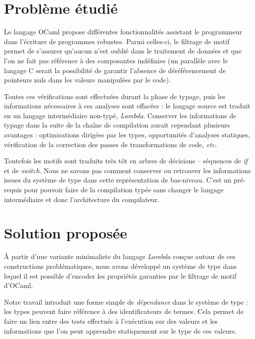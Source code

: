 \documentclass[12pt]{article}
\begin{document}
\pagestyle{empty}

\section*{Problème étudié}
Le langage OCaml propose différentes fonctionnalités assistant le programmeur
dans l'écriture de programmes robustes. Parmi celles-ci, le filtrage de motif
permet de s'assurer qu'aucun n'est oublié dans le traitement de données et que
l'on ne fait pas référence à des composantes indéfinies (un parallèle avec le
langage C serait la possibilité de garantir l'absence de déréférencement de
pointeurs nuls dans les valeurs manipulées par le code).

Toutes ces vérifications sont effectuées durant la phase de typage, puis les
informations nécessaires à ces analyses sont effacées : le langage source est
traduit en un langage intermédiaire non-typé, \emph{Lambda}. Conserver les
informations de typage dans la suite de la chaîne de compilation aurait
cependant plusieurs avantages : optimisations dirigées par les types,
opportunités d'analyses statiques, vérification de la correction des passes de
transformations de code, \emph{etc}.

Toutefois les motifs sont traduits très tôt en arbres de décisions --
séquences de \emph{if} et de \emph{switch}. Nous ne savons pas comment
conserver ou retrouver les informations issues du système de type dans cette
représentation de bas-niveau. C'est un pré-requis pour pouvoir faire de la
compilation typée sans changer le langage intermédiaire et donc l'architecture
du compilateur.

\section*{Solution proposée}
À partir d'une variante minimaliste du langage \emph{Lambda} conçue autour de
ces constructions problématiques, nous avons développé un système de type dans
lequel il est possible d'encoder les propriétés garanties par le filtrage de
motif d'OCaml.

Notre travail introduit une forme simple de \emph{dépendance} dans le système
de type : les types peuvent faire référence à des identificateurs de termes.
Cela permet de faire un lien entre des tests effectués à l'exécution sur des
valeurs et les informations que l'on peut apprendre statiquement sur le type
de ces valeurs.
\end{document}
